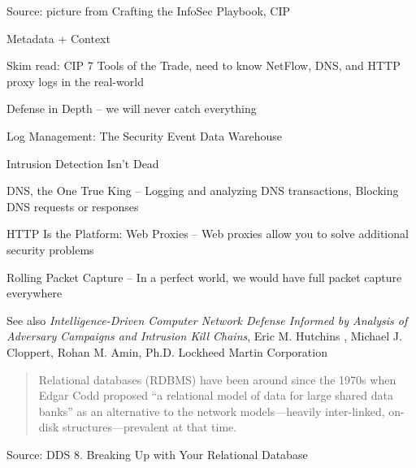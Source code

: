 \documentclass[Screen16to9,17pt]{foils}
\begin{document}
Source: picture from Crafting the InfoSec Playbook, CIP

Metadata + Context


\begin{list1}
\item Skim read: CIP 7 Tools of the Trade, need to know NetFlow, DNS, and HTTP proxy logs in the real-world
\begin{list2}
\item Defense in Depth -- we will never catch everything
\item Log Management: The Security Event Data Warehouse
\item Intrusion Detection Isn’t Dead
\item DNS, the One True King -- Logging and analyzing DNS transactions, Blocking DNS requests or responses
\item HTTP Is the Platform: Web Proxies -- Web proxies allow you to solve additional security problems
\item Rolling Packet Capture -- In a perfect world, we would have full packet capture everywhere
\end{list2}
\end{list1}




\begin{list2}
\item See also \emph{Intelligence-Driven Computer Network Defense Informed by Analysis of Adversary Campaigns and Intrusion Kill Chains}, Eric M. Hutchins , Michael J. Cloppert, Rohan M. Amin, Ph.D. Lockheed Martin Corporation\\{\footnotesize
 }
\end{list2}




\begin{quote}
Relational databases (RDBMS) have been around since the 1970s when Edgar Codd proposed “a relational model of data for large shared data banks” as an alternative to the network models—heavily inter-linked, on-disk structures—prevalent at that time.
\end{quote}
Source: DDS 8. Breaking Up with Your Relational Database
\end{document}
